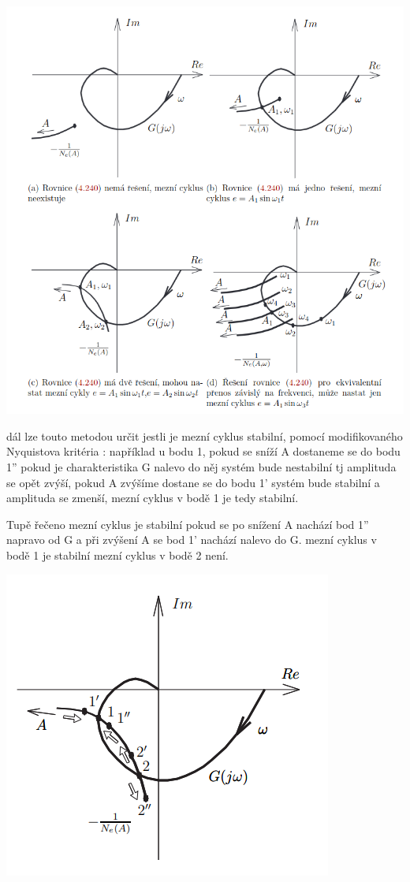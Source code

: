 \includegraphics[scale = 0.5]{img/HarmMet.png}

dál lze touto metodou určit jestli je mezní cyklus stabilní, pomocí modifikovaného Nyquistova kritéria :
například u bodu 1, pokud se sníží A dostaneme se do bodu 1'' pokud je charakteristika G nalevo do něj systém bude nestabilní tj amplituda se opět zvýší, pokud A zvýšíme dostane se do bodu 1' systém bude stabilní a amplituda se zmenší, mezní cyklus v bodě 1 je tedy stabilní.

Tupě řečeno mezní cyklus je stabilní pokud se po snížení A nachází bod 1'' napravo od G a při zvýšení A se bod 1' nachází nalevo do G.
mezní cyklus v bodě 1 je stabilní mezní cyklus v bodě 2 není.

\includegraphics[scale = 0.8]{img/stab.mez.cyklu.png}

